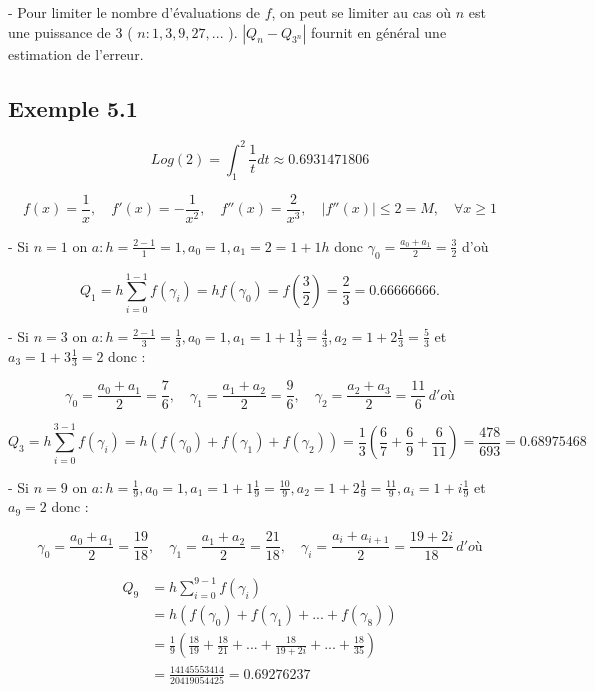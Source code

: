 - Pour limiter le nombre d'évaluations de \( f \), on peut se limiter au cas où \( n \) est une puissance de 3 ( \( n : 1, 3, 9, 27, ... \) ). \( |Q_n - Q_{3^n}| \) fournit en général une estimation de l'erreur.

\subsection{Exemple 5.1}
\[
Log(2) = \displaystyle\int_1^2 \frac{1}{t} dt \approx 0.6931471806
\]

\[
f(x) = \frac{1}{x}, \quad f'(x) = -\frac{1}{x^2}, \quad f''(x) = \frac{2}{x^3}, \quad |f''(x)| \leq 2 = M, \quad \forall x \geq 1
\]

- Si \( n = 1 \) on \( a : h = \frac{2-1}{1} = 1, a_0 = 1, a_1 = 2 = 1 + 1h \) donc \( \gamma_0 = \frac{a_0+a_1}{2} = \frac{3}{2} \) d'où

\[
Q_1 = h \displaystyle\sum_{i=0}^{1-1} f(\gamma_i) = hf(\gamma_0) = f\left(\frac{3}{2}\right) = \frac{2}{3} = 0.66666666.
\]

- Si \( n = 3 \) on \( a : h = \frac{2-1}{3} = \frac{1}{3}, a_0 = 1, a_1 = 1 + 1\frac{1}{3} = \frac{4}{3}, a_2 = 1 + 2\frac{1}{3} = \frac{5}{3} \) et \( a_3 = 1 + 3\frac{1}{3} = 2 \) donc :

\[
\gamma_0 = \frac{a_0+a_1}{2} = \frac{7}{6}, \quad \gamma_1 = \frac{a_1+a_2}{2} = \frac{9}{6}, \quad \gamma_2 = \frac{a_2+a_3}{2} = \frac{11}{6} \, d'où
\]

\[
Q_3 = h \displaystyle\sum_{i=0}^{3-1} f(\gamma_i) = h(f(\gamma_0) + f(\gamma_1) + f(\gamma_2)) = \frac{1}{3} \left( \frac{6}{7} + \frac{6}{9} + \frac{6}{11} \right) = \frac{478}{693} = 0.68975468
\]

- Si \( n = 9 \) on \( a : h = \frac{1}{9}, a_0 = 1, a_1 = 1 + 1\frac{1}{9} = \frac{10}{9}, a_2 = 1 + 2\frac{1}{9} = \frac{11}{9}, a_i = 1 + i\frac{1}{9} \) et \( a_9 = 2 \) donc :

\[
\gamma_0 = \frac{a_0+a_1}{2} = \frac{19}{18}, \quad \gamma_1 = \frac{a_1+a_2}{2} = \frac{21}{18}, \quad \gamma_i = \frac{a_i+a_{i+1}}{2} = \frac{19+2i}{18} \, d'où
\]

\begin{align*}
Q_9 &= h \displaystyle\sum_{i=0}^{9-1} f(\gamma_i)\\
&= h(f(\gamma_0) + f(\gamma_1) + ... + f(\gamma_8))\\
&= \frac{1}{9} \left( \frac{18}{19} + \frac{18}{21} + ... + \frac{18}{19+2i} + ... + \frac{18}{35} \right)\\
&= \frac{14145553414}{20419054425} = 0.69276237
\end{align*}

